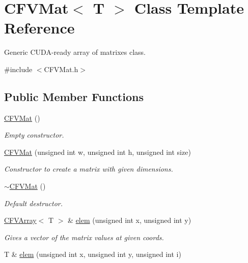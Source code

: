 \hypertarget{classFVL_1_1CFVMat}{
\section{CFVMat$<$ T $>$ Class Template Reference}
\label{d9/dcb/classFVL_1_1CFVMat}
}


Generic CUDA-\/ready array of matrixes class.  




{\ttfamily \#include $<$CFVMat.h$>$}

\subsection*{Public Member Functions}
\begin{DoxyCompactItemize}
\item 
\hyperlink{classFVL_1_1CFVMat_a51ff8888d077d558b27474c15368baf9}{CFVMat} ()
\begin{DoxyCompactList}\small\item\em Empty constructor. \item\end{DoxyCompactList}\item 
\hyperlink{classFVL_1_1CFVMat_a90b5cd38bfc076884d1f3cacc9f35cee}{CFVMat} (unsigned int w, unsigned int h, unsigned int size)
\begin{DoxyCompactList}\small\item\em Constructor to create a matrix with given dimensions. \item\end{DoxyCompactList}\item 
\hyperlink{classFVL_1_1CFVMat_a9746a1a3f248769a1268c2a225cedd52}{$\sim$CFVMat} ()
\begin{DoxyCompactList}\small\item\em Default destructor. \item\end{DoxyCompactList}\item 
\hyperlink{classFVL_1_1CFVArray}{CFVArray}$<$ T $>$ \& \hyperlink{classFVL_1_1CFVMat_ab179d788531c0f2d2f17e75896112f63}{elem} (unsigned int x, unsigned int y)
\begin{DoxyCompactList}\small\item\em Gives a vector of the matrix values at given coords. \item\end{DoxyCompactList}\item 
T \& \hyperlink{classFVL_1_1CFVMat_a2d02be460deeb3ad73a4bf0a3f9beb4d}{elem} (unsigned int x, unsigned int y, unsigned int i)

\end{DoxyCompactItemize}
